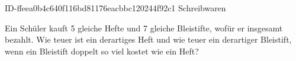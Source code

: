 \begin{exercise}
      {ID-ffeea0b4c640f116bd81176eacbbc120244f92c1}
      {Schreibwaren}
  \ifproblem\problem\par
    Ein Schüler kauft 5 gleiche Hefte und 7 gleiche Bleistifte, wofür er
    insgesamt  bezahlt. Wie teuer ist ein derartiges Heft und wie
    teuer ein derartiger Bleistift, wenn ein Bleistift doppelt so viel kostet
    wie ein Heft?
  \fi
\end{exercise}
